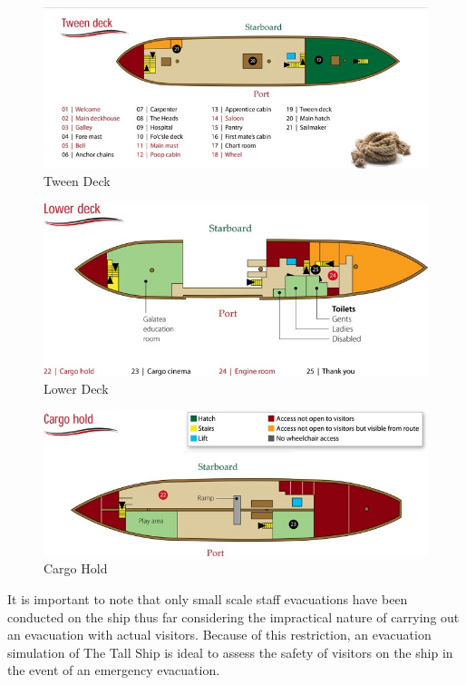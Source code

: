 \begin{figure}
\centering
\includegraphics[scale=0.4]{../images/tweendeck.jpg}
\caption{Tween Deck}
\end{figure}

\begin{figure}
\centering
\includegraphics[scale=0.4]{../images/lowerdeck.jpg}
\caption{Lower Deck}
\end{figure}

\begin{figure}
\centering
\includegraphics[scale=0.4]{../images/cargohold.jpg}
\caption{Cargo Hold}
\end{figure}

It is important to note that only small scale staff evacuations have been conducted on the ship
thus far considering the impractical nature of carrying out an evacuation with
actual visitors. Because of this restriction, an evacuation simulation of The
Tall Ship is ideal to assess the safety of visitors on the ship in the event of an
emergency evacuation.

%

%

